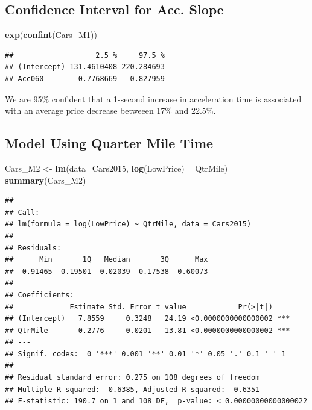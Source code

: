 \documentclass[]{book}
\newenvironment{Shaded}{\begin{snugshade}}{\end{snugshade}}
\newcommand{\KeywordTok}[1]{\textcolor[rgb]{0.13,0.29,0.53}{\textbf{#1}}}
\newcommand{\DataTypeTok}[1]{\textcolor[rgb]{0.13,0.29,0.53}{#1}}
\newcommand{\StringTok}[1]{\textcolor[rgb]{0.31,0.60,0.02}{#1}}
\newcommand{\OperatorTok}[1]{\textcolor[rgb]{0.81,0.36,0.00}{\textbf{#1}}}
\newcommand{\NormalTok}[1]{#1}
\begin{document}
\subsection{Confidence Interval for Acc.
Slope}\label{confidence-interval-for-acc.-slope}

\begin{Shaded}
\begin{Highlighting}[]
\KeywordTok{exp}\NormalTok{(}\KeywordTok{confint}\NormalTok{(Cars_M1))}
\end{Highlighting}
\end{Shaded}

\begin{verbatim}
##                   2.5 %     97.5 %
## (Intercept) 131.4610408 220.284693
## Acc060        0.7768669   0.827959
\end{verbatim}

We are 95\% confident that a 1-second increase in acceleration time is
associated with an average price decrease betweeen 17\% and 22.5\%.

\subsection{Model Using Quarter Mile
Time}\label{model-using-quarter-mile-time}

\begin{Shaded}
\begin{Highlighting}[]
\NormalTok{Cars_M2 <-}\StringTok{ }\KeywordTok{lm}\NormalTok{(}\DataTypeTok{data=}\NormalTok{Cars2015, }\KeywordTok{log}\NormalTok{(LowPrice) }\OperatorTok{~}\StringTok{ }\NormalTok{QtrMile)}
\KeywordTok{summary}\NormalTok{(Cars_M2)}
\end{Highlighting}
\end{Shaded}

\begin{verbatim}
## 
## Call:
## lm(formula = log(LowPrice) ~ QtrMile, data = Cars2015)
## 
## Residuals:
##      Min       1Q   Median       3Q      Max 
## -0.91465 -0.19501  0.02039  0.17538  0.60073 
## 
## Coefficients:
##             Estimate Std. Error t value            Pr(>|t|)    
## (Intercept)   7.8559     0.3248   24.19 <0.0000000000000002 ***
## QtrMile      -0.2776     0.0201  -13.81 <0.0000000000000002 ***
## ---
## Signif. codes:  0 '***' 0.001 '**' 0.01 '*' 0.05 '.' 0.1 ' ' 1
## 
## Residual standard error: 0.275 on 108 degrees of freedom
## Multiple R-squared:  0.6385, Adjusted R-squared:  0.6351 
## F-statistic: 190.7 on 1 and 108 DF,  p-value: < 0.00000000000000022
\end{verbatim}
\end{document}
